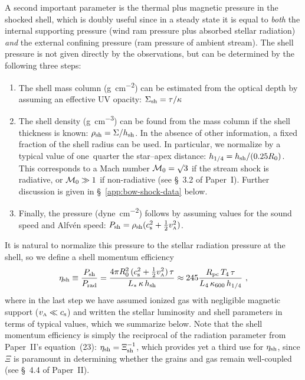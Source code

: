 A second important parameter is the thermal plus magnetic pressure in
the shocked shell, which is doubly useful since in a steady state it
is equal to \emph{both} the internal supporting pressure (wind ram
pressure plus absorbed stellar radiation) \emph{and} the external
confining pressure (ram pressure of ambient stream).  The shell
pressure is not given directly by the observations, but can be
determined by the following three steps:
\begin{enumerate}[P1.]
\item \label{P1} The shell mass column (\si{g.cm^{-2}}) can be
  estimated from the optical depth by assuming an effective UV
  opacity: \(\Sigma_{\text{sh}} = \tau / \kappa\)
\item \label{P2} The shell density (\si{g.cm^{-3}}) can be found from
  the mass column if the shell thickness is known:
  \(\rho_{\text{sh}} = \Sigma / h_{\text{sh}}\).  In the absence of other information, a
  fixed fraction of the shell radius can be used.  In particular, we
  normalize by a typical value of one~quarter the star--apex distance:
  \(h_{1/4} = h_{\text{sh}} / (0.25 R_0)\).  This corresponds to a Mach
  number \(\mathcal{M}_0 = \surd 3\) if the stream shock is radiative, or
  \(\mathcal{M}_0 \gg 1\) if non-radiative (see \S~3.2 of Paper~I). Further
  discussion is given in \S~\ref{app:bow-shock-data} below. 
\item \label{P3} Finally, the pressure (\si{dyne.cm^{-2}}) follows by
  assuming values for the sound speed and Alfvén speed:
  \(P_{\text{sh}} = \rho_{\text{sh}} (c_{\text{s}}^2 + \frac12 v_{\scriptscriptstyle\text{A}}^2) \).
\end{enumerate}
It is natural to normalize this pressure to the stellar radiation
pressure at the shell, so we define a shell momentum efficiency
\newcommand\pc{\ensuremath{_{\text{pc}}}}
\begin{equation}
  \label{eq:eta-shell}
  \eta\shell \equiv \frac{P\shell}{P\rad}
  = \frac{4\pi R_0^2\, (\sound^2 + \frac12 v\alfven^2)\, \tau}{L_*\, \kappa\, h\shell}
  \approx 245 \frac{R\pc \, T_4 \, \tau}{L_4 \, \kappa_{600} \, h_{1/4}} \ , 
\end{equation}
where in the last step we have assumed ionized gas with negligible
magnetic support (\(v_{\scriptscriptstyle\text{A}} \ll c_{\text{s}}\)) and written the stellar
luminosity and shell parameters in terms of typical values, which we
summarize below.  Note that the shell momentum efficiency is simply
the reciprocal of the radiation parameter from Paper~II's equation~(23):
\(\eta_{\text{sh}} = \Xi_{\text{sh}}^{-1}\), which provides yet a third use for
\(\eta_{\text{sh}}\), since \(\Xi\) is paramount in determining whether the
grains and gas remain well-coupled (see \S~4.4 of Paper~II).

